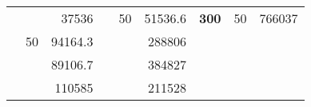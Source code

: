 \begin{table}[]
\begin{tabular}{|ccrccrccc}
\rowcolor[HTML]{DDFDFF} 
\multicolumn{1}{|c|}{\cellcolor[HTML]{FFFFC7}}                                & \multicolumn{1}{c|}{\cellcolor[HTML]{DDFDFF}}                      & \multicolumn{1}{r|}{\cellcolor[HTML]{DAE8FC}37536}     & \multicolumn{1}{c|}{\cellcolor[HTML]{FFFFC7}}                                & \multicolumn{1}{c|}{\multirow{-10}{*}{\cellcolor[HTML]{DDFDFF}50}}  & \multicolumn{1}{r|}{\cellcolor[HTML]{DDFDFF}51536.6}   & \multicolumn{1}{c|}{\multirow{-19}{*}{\cellcolor[HTML]{FFFFC7}\textbf{300}}} & \multicolumn{1}{c|}{\multirow{-10}{*}{\cellcolor[HTML]{DDFDFF}50}} & \multicolumn{1}{r|}{\cellcolor[HTML]{DDFDFF}766037}    \\ \cline{3-3} \cline{5-9} 
\multicolumn{1}{|c|}{\cellcolor[HTML]{FFFFC7}}                                & \multicolumn{1}{c|}{\multirow{-10}{*}{\cellcolor[HTML]{DDFDFF}50}} & \multicolumn{1}{r|}{\cellcolor[HTML]{DDFDFF}94164.3}   & \multicolumn{1}{c|}{\cellcolor[HTML]{FFFFC7}}                                & \multicolumn{1}{c|}{\cellcolor[HTML]{DAE8FC}}                       & \multicolumn{1}{r|}{\cellcolor[HTML]{DAE8FC}288806}    &                                                                              &                                                                    &                                                        \\ \cline{2-3} \cline{6-6}
\multicolumn{1}{|c|}{\cellcolor[HTML]{FFFFC7}}                                & \multicolumn{1}{c|}{\cellcolor[HTML]{DAE8FC}}                      & \multicolumn{1}{r|}{\cellcolor[HTML]{DAE8FC}89106.7}   & \multicolumn{1}{c|}{\cellcolor[HTML]{FFFFC7}}                                & \multicolumn{1}{c|}{\cellcolor[HTML]{DAE8FC}}                       & \multicolumn{1}{r|}{\cellcolor[HTML]{DDFDFF}384827}    &                                                                              &                                                                    &                                                        \\ \cline{3-3} \cline{6-6}
\multicolumn{1}{|c|}{\cellcolor[HTML]{FFFFC7}}                                & \multicolumn{1}{c|}{\cellcolor[HTML]{DAE8FC}}                      & \multicolumn{1}{r|}{\cellcolor[HTML]{DDFDFF}110585}    & \multicolumn{1}{c|}{\cellcolor[HTML]{FFFFC7}}                                & \multicolumn{1}{c|}{\cellcolor[HTML]{DAE8FC}}                       & \multicolumn{1}{r|}{\cellcolor[HTML]{DAE8FC}211528}    &                                                                              &                                                                    &                                                        \\ \cline{3-3} \cline{6-6}

\end{tabular}
\end{table}
